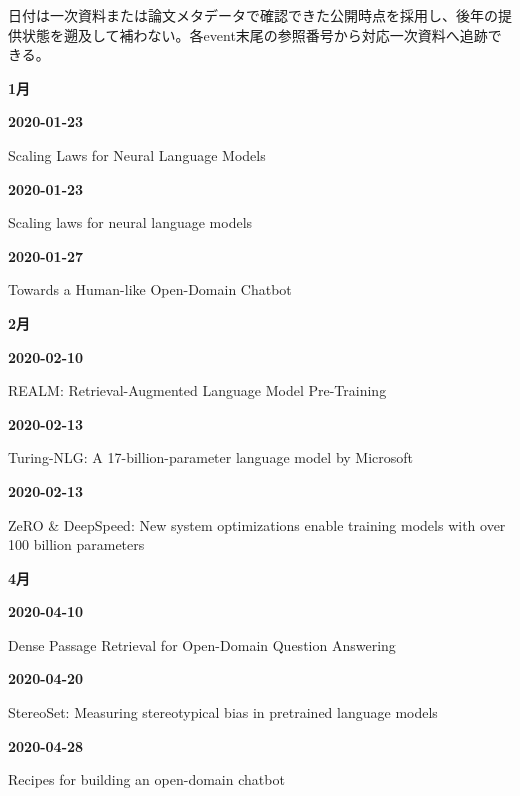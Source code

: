 \noindent 日付は一次資料または論文メタデータで確認できた公開時点を採用し、後年の提供状態を遡及して補わない。各event末尾の参照番号から対応一次資料へ追跡できる。
\par\medskip
\medskip
\noindent\textbf{1月}\par
\smallskip
\noindent\textbf{2020-01-23}\par
{\raggedright Scaling Laws for Neural Language Models\,\cite{src-7a3002b6ab1d}\par}
\smallskip
\noindent\textbf{2020-01-23}\par
{\raggedright Scaling laws for neural language models\,\cite{chron-bd2a7f12ec03}\par}
\smallskip
\noindent\textbf{2020-01-27}\par
{\raggedright Towards a Human-like Open-Domain Chatbot\,\cite{src-8930f1933983}\par}
\smallskip
\medskip
\noindent\textbf{2月}\par
\smallskip
\noindent\textbf{2020-02-10}\par
{\raggedright REALM: Retrieval-Augmented Language Model Pre-Training\,\cite{src-4bf65d8fc7dc}\par}
\smallskip
\noindent\textbf{2020-02-13}\par
{\raggedright Turing-NLG: A 17-billion-parameter language model by Microsoft\,\cite{chron-308815925baf}\par}
\smallskip
\noindent\textbf{2020-02-13}\par
{\raggedright ZeRO \& DeepSpeed: New system optimizations enable training models with over 100 billion parameters\,\cite{src-f1047e7f654c}\par}
\smallskip
\medskip
\noindent\textbf{4月}\par
\smallskip
\noindent\textbf{2020-04-10}\par
{\raggedright Dense Passage Retrieval for Open-Domain Question Answering\,\cite{chron-abbd73dcf0fc}\par}
\smallskip
\noindent\textbf{2020-04-20}\par
{\raggedright StereoSet: Measuring stereotypical bias in pretrained language models\,\cite{chron-0204091fe4a1}\par}
\smallskip
\noindent\textbf{2020-04-28}\par
{\raggedright Recipes for building an open-domain chatbot\,\cite{src-8260c320e205}\par}
\smallskip
